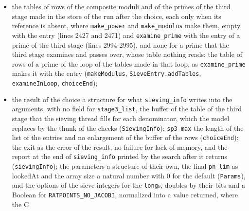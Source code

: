 \begin{itemize}
    examined a table of their records with a list of the pairs examined, for the buffer \verb|pws|,
    its count and the array \verb|pw_idx| with its markers, and no test of room in the buffer and no
    bound \verb|npw_max|, which never bind (\verb|PowerTable|, \verb|powerIndex|, \verb|addModuli|);
    the entry of a prime power made for each composite modulus that needs it, where
    \verb|make_modulus| makes it once and keeps it by its index (\verb|makeModulus|); the candidates
    dropped and swapped by the operations of arrays, for the loops that move them
    (\verb|takeEntries|, \verb|thirdStage|); the loop of the tables a loop over the first
    $\mathrm{numPrimes}$ positions that ends when the position reaches the number to look at, which
    the body raises, with no clearing of the arrays that its state starts empty (\verb|tablesLoop|);
  \item the tables of rows of the composite moduli and of the primes of the third stage made in the
    store of the run after the choice, each only when its reference is absent, where
    \verb|make_power| and \verb|make_modulus| make them, empty, with the entry (lines 2427 and 2471)
    and \verb|examine_prime| with the entry of a prime of the third stage (lines 2994-2995), and
    none for a prime that the third stage examines and passes over, whose table nothing reads; the
    table of rows of a prime of the loop of the tables made in that loop, as \verb|examine_prime|
    makes it with the entry (\verb|makeModulus|, \verb|SieveEntry.addTables|, \verb|examineInLoop|,
    \verb|choiceEnd|);
  \item the result of the choice a structure for what \verb|sieving_info| writes into the arguments,
    with no field for \verb|stage3_list|, the buffer of the table of the third stage that the
    sieving thread fills for each denominator, which the model replaces by the thunk of the checks
    (\verb|SievingInfo|); \verb|sp3_max| the length of the list of the entries and no enlargement of
    the buffer of the rows (\verb|choiceEnd|); the exit as the error of the result, no failure for
    lack of memory, and the report at the end of \verb|sieving_info| printed by the search after it
    returns (\verb|sievingInfo|); the parameters a structure of their own, the final \verb|pn_lim|
    as $\mathrm{lookedAt}$ and the array size a natural number with $0$ for the default
    (\verb|Params|), and the options of the sieve integers for the \verb|long|s, doubles by their
    bits and a Boolean for \verb|RATPOINTS_NO_JACOBI|, normalized into a value returned, where the C

\end{itemize}
